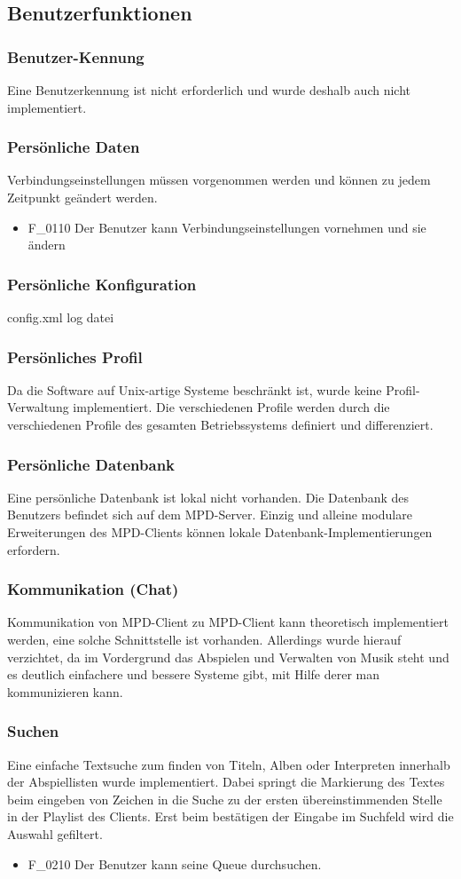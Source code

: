 \subsection{Benutzerfunktionen}
\subsubsection{Benutzer-Kennung}
Eine Benutzerkennung ist nicht erforderlich und wurde deshalb auch nicht implementiert.
\subsubsection{Persönliche Daten}
Verbindungseinstellungen müssen vorgenommen werden und können zu jedem Zeitpunkt geändert werden.
\begin{itemize}
	\item F\_0110 Der Benutzer kann Verbindungseinstellungen vornehmen und sie ändern
\end{itemize}
\subsubsection{Persönliche Konfiguration}
config.xml
log datei
\subsubsection{Persönliches Profil}
Da die Software auf Unix-artige Systeme beschränkt ist, wurde keine Profil-Verwaltung implementiert. Die
verschiedenen Profile werden durch die verschiedenen Profile des gesamten Betriebssystems definiert und differenziert.
\subsubsection{Persönliche Datenbank}
Eine persönliche Datenbank ist lokal nicht vorhanden. Die Datenbank des Benutzers befindet sich auf dem MPD-Server.
Einzig und alleine modulare Erweiterungen des MPD-Clients können lokale Datenbank-Implementierungen erfordern.
\subsubsection{Kommunikation (Chat)}
Kommunikation von MPD-Client zu MPD-Client kann theoretisch implementiert werden, eine solche Schnittstelle ist vorhanden.
Allerdings wurde hierauf verzichtet, da im Vordergrund das Abspielen und Verwalten von Musik steht und es deutlich
einfachere und bessere Systeme gibt, mit Hilfe derer man kommunizieren kann.
\subsubsection{Suchen}
Eine einfache Textsuche zum finden von Titeln, Alben oder Interpreten innerhalb der Abspiellisten wurde implementiert.
Dabei springt die Markierung des Textes beim eingeben von Zeichen in die Suche zu der ersten übereinstimmenden
Stelle in der Playlist des Clients. Erst beim bestätigen der Eingabe im Suchfeld wird die Auswahl gefiltert.
\begin{itemize}
        \item F\_0210 Der Benutzer kann seine Queue durchsuchen.
\end{itemize}
